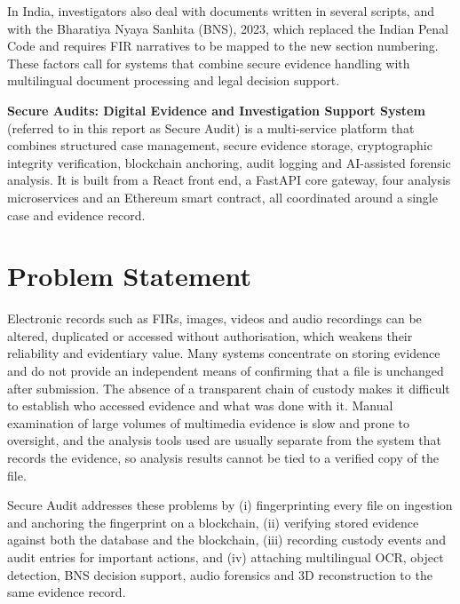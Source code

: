 \documentclass[12pt,a4paper,oneside]{report}
\begin{document}
In India, investigators also deal with documents written in several scripts, and with the Bharatiya Nyaya Sanhita (BNS), 2023, which replaced the Indian Penal Code and requires FIR narratives to be mapped to the new section numbering. These factors call for systems that combine secure evidence handling with multilingual document processing and legal decision support.

\textbf{Secure Audits: Digital Evidence and Investigation Support System} (referred to in this report as Secure Audit) is a multi-service platform that combines structured case management, secure evidence storage, cryptographic integrity verification, blockchain anchoring, audit logging and AI-assisted forensic analysis. It is built from a React front end, a FastAPI core gateway, four analysis microservices and an Ethereum smart contract, all coordinated around a single case and evidence record.

\section{Problem Statement}
Electronic records such as FIRs, images, videos and audio recordings can be altered, duplicated or accessed without authorisation, which weakens their reliability and evidentiary value. Many systems concentrate on storing evidence and do not provide an independent means of confirming that a file is unchanged after submission. The absence of a transparent chain of custody makes it difficult to establish who accessed evidence and what was done with it. Manual examination of large volumes of multimedia evidence is slow and prone to oversight, and the analysis tools used are usually separate from the system that records the evidence, so analysis results cannot be tied to a verified copy of the file.

Secure Audit addresses these problems by (i) fingerprinting every file on ingestion and anchoring the fingerprint on a blockchain, (ii) verifying stored evidence against both the database and the blockchain, (iii) recording custody events and audit entries for important actions, and (iv) attaching multilingual OCR, object detection, BNS decision support, audio forensics and 3D reconstruction to the same evidence record.
\end{document}
